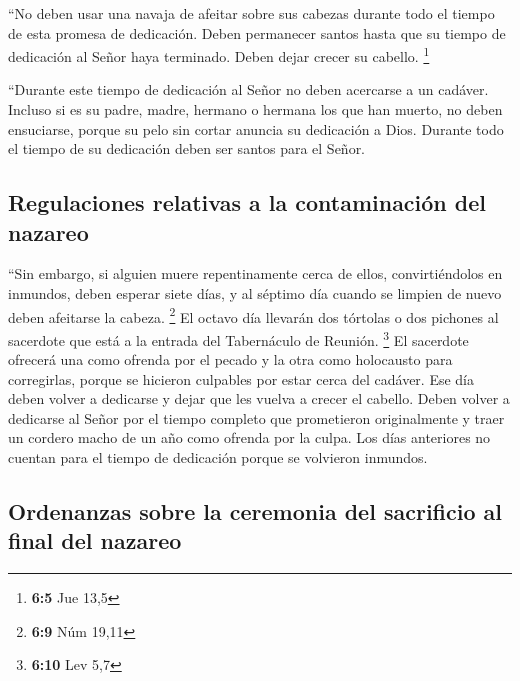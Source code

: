  ``No deben usar una navaja de afeitar sobre sus cabezas
durante todo el tiempo de esta promesa de dedicación. Deben permanecer
santos hasta que su tiempo de dedicación al Señor haya terminado. Deben
dejar crecer su cabello. \footnote{\textbf{6:5} Jue 13,5}

 ``Durante este tiempo de dedicación al Señor no deben
acercarse a un cadáver.  Incluso si es su padre, madre,
hermano o hermana los que han muerto, no deben ensuciarse, porque su
pelo sin cortar anuncia su dedicación a Dios.  Durante
todo el tiempo de su dedicación deben ser santos para el Señor.

\hypertarget{regulaciones-relativas-a-la-contaminaciuxf3n-del-nazareo}{%
\subsection{Regulaciones relativas a la contaminación del
nazareo}\label{regulaciones-relativas-a-la-contaminaciuxf3n-del-nazareo}}

 ``Sin embargo, si alguien muere repentinamente cerca de
ellos, convirtiéndolos en inmundos, deben esperar siete días, y al
séptimo día cuando se limpien de nuevo deben afeitarse la cabeza.
\footnote{\textbf{6:9} Núm 19,11}  El octavo día llevarán
dos tórtolas o dos pichones al sacerdote que está a la entrada del
Tabernáculo de Reunión. \footnote{\textbf{6:10} Lev 5,7} 
El sacerdote ofrecerá una como ofrenda por el pecado y la otra como
holocausto para corregirlas, porque se hicieron culpables por estar
cerca del cadáver. Ese día deben volver a dedicarse y dejar que les
vuelva a crecer el cabello.  Deben volver a dedicarse al
Señor por el tiempo completo que prometieron originalmente y traer un
cordero macho de un año como ofrenda por la culpa. Los días anteriores
no cuentan para el tiempo de dedicación porque se volvieron inmundos.

\hypertarget{ordenanzas-sobre-la-ceremonia-del-sacrificio-al-final-del-nazareo}{%
\subsection{Ordenanzas sobre la ceremonia del sacrificio al final del
nazareo}\label{ordenanzas-sobre-la-ceremonia-del-sacrificio-al-final-del-nazareo}}

